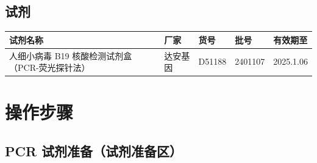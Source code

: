 \documentclass[UTF8,10pt,a4paper,fontset=fandol]{ctexart}
\newcommand{\fieldvalue}[1]{#1}
\newcommand{\handwritten}[1]{#1}
\begin{document}
\subsection{试剂}

\begin{center}
\small
\begin{tabular}{|p{3.5cm}|p{2.5cm}|p{2.5cm}|p{2.5cm}|p{2.5cm}|}
\hline
试剂名称 & 厂家 & 货号 & 批号 & 有效期至\\
\hline
\fieldvalue{人细小病毒 B19 核酸检测试剂盒（PCR-荧光探针法）} &
\fieldvalue{达安基因} &
\fieldvalue{\handwritten{D51188}} &
\fieldvalue{\handwritten{2401107}} &
\fieldvalue{\handwritten{2025.1.06}}\\
\hline
\end{tabular}
\end{center}

\section{操作步骤}

\subsection*{PCR 试剂准备（试剂准备区）}
\end{document}
